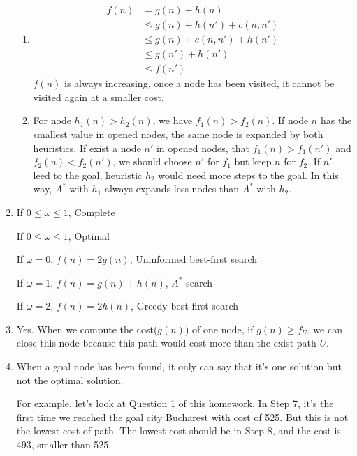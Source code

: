 \documentclass{article}
\begin{document}
\begin{enumerate}
\begin{enumerate}
  \item
  \begin{equation}
  \begin{aligned}
  f(n) &= g(n) + h(n) \\
       &\leqslant g(n) + h(n') + c(n,n') \\  
       &\leqslant g(n) + c(n,n') + h(n') \\
       &\leqslant g(n') + h(n') \\
       &\leqslant f(n')       
  \end{aligned}
  \end{equation} 
  $f(n)$ is always increasing, once a node has been visited, it cannot be visited again at a smaller cost. 

  \item
  For node $h_1(n) > h_2(n)$, we have $f_1(n) > f_2(n)$. 
  If node $n$ has the smallest value in opened nodes, the same node is expanded by both heuristics.
  If exist a node $n'$ in opened nodes, that $f_1(n) > f_1(n')$ and $f_2(n) < f_2(n')$, we should choose $n'$ for $f_1$ but keep $n$ for $f_2$. If $n'$ leed to the goal, heuristic $h_2$ would need more steps to the goal. In this way, $A^*$ with $h_1$ always expands less nodes than $A^*$ with $h_2$.


\end{enumerate}


\item

If $0 \leqslant \omega \leqslant 1$, Complete

If $0 \leqslant \omega \leqslant 1$, Optimal

If $\omega = 0$, $f(n)=2g(n)$, Uninformed best-first search

If $\omega = 1$, $f(n)=g(n)+h(n)$, $A^*$ search

If $\omega = 2$, $f(n)=2h(n)$, Greedy best-first search

\item
Yes. When we compute the cost($g(n)$) of one node, if $g(n) \geqslant f_U$, we can close this node because this path would cost more than the exist path $U$.

\item
When a goal node has been found, it only can say that it's one solution but not the optimal solution.

For example, let's look at Question 1 of this homework. In Step 7, it's the first time we reached the goal city Bucharest with cost of 525. But this is not the lowest cost of path. The lowest cost should be in Step 8, and the cost is 493, smaller than 525.

\end{enumerate}
\end{document}
